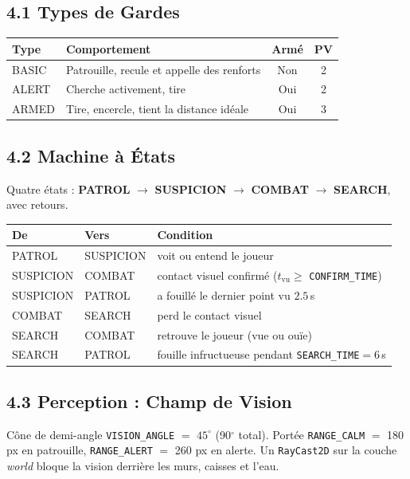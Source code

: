 \documentclass[11pt,a4paper]{article}
\newcommand{\code}[1]{\colorbox{codebg}{\texttt{#1}}}
\newcommand{\param}[2]{\code{#1} $=$ #2}
\begin{document}
\subsection{4.1 Types de Gardes}
\begin{center}
\begin{tabular}{llcc}
\toprule
\textbf{Type} & \textbf{Comportement} & \textbf{Arm\'e} & \textbf{PV} \\
\midrule
BASIC & Patrouille, recule et appelle des renforts & Non & 2 \\
ALERT & Cherche activement, tire & Oui & 2 \\
ARMED & Tire, encercle, tient la distance id\'eale & Oui & 3 \\
\bottomrule
\end{tabular}
\end{center}

\subsection{4.2 Machine \`a \'Etats}
Quatre \'etats : \textbf{PATROL} $\to$ \textbf{SUSPICION} $\to$ \textbf{COMBAT}
$\to$ \textbf{SEARCH}, avec retours.

\begin{center}\small
\begin{tabular}{lll}
\toprule
\textbf{De} & \textbf{Vers} & \textbf{Condition} \\
\midrule
PATROL & SUSPICION & voit ou entend le joueur \\
SUSPICION & COMBAT & contact visuel confirm\'e ($t_{\text{vu}}\geq$ \texttt{CONFIRM\_TIME}) \\
SUSPICION & PATROL & a fouill\'e le dernier point vu $2.5$\,s \\
COMBAT & SEARCH & perd le contact visuel \\
SEARCH & COMBAT & retrouve le joueur (vue ou ou\"ie) \\
SEARCH & PATROL & fouille infructueuse pendant \texttt{SEARCH\_TIME}$=6$\,s \\
\bottomrule
\end{tabular}
\end{center}

\subsection{4.3 Perception : Champ de Vision}
C\^one de demi-angle \param{VISION\_ANGLE}{$45^\circ$} (90$^\circ$ total). Port\'ee
\param{RANGE\_CALM}{180} px en patrouille, \param{RANGE\_ALERT}{260} px en alerte.
Un \code{RayCast2D} sur la couche \emph{world} bloque la vision derri\`ere les
murs, caisses et l'eau.
\end{document}
